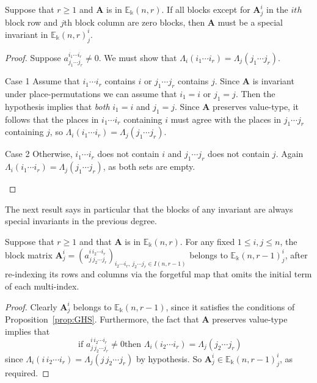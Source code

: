 \documentclass[ALCO,ThmDefs,Unicode,epreuves]{cedram}
\newcommand{\E}{\mathbb{E}}
\newcommand{\bA}{\mathbf{A}}
\begin{document}
\begin{lemm}\label{lem:special-criterion}
 Suppose that $r\ge 1$ and $\bA$ is in $\E_\Bbbk(n,r)$. If all blocks
 except for $\bA^i_j$ in the $ith$ block row and $j$th block column
 are zero blocks, then $\bA$ must be a special invariant in
 $\E_\Bbbk(n,r)^i_j$.
\end{lemm}

\begin{proof}
Suppose $a^{i_1 \cdots i_r}_{j_1\cdots j_r} \ne 0$. We must show
that $\Lambda_i(i_1 \cdots i_r) = \Lambda_j(j_1 \cdots j_r)$.

\begin{enonce*}[remark]{\hypertarget{lemma4.2C1}{Case 1}} Assume that $i_1 \cdots i_r$ contains $i$ or $j_1
\cdots j_r$ contains $j$. Since $\bA$ is invariant under
place-permutations we can assume that $i_1=i$ or $j_1=j$. Then the
hypothesis implies that \emph{both} $i_1=i$ and $j_1=j$. Since $\bA$
preserves value-type, it follows that the places in $i_1 \cdots i_r$
containing $i$ must agree with the places in $j_1 \cdots j_r$
containing $j$, so $\Lambda_i(i_1 \cdots i_r) = \Lambda_j(j_1 \cdots
j_r)$.
\end{enonce*}

\begin{enonce*}[remark]{\hypertarget{lemma4.2C2}{Case 2}} Otherwise, $i_1 \cdots i_r$ does not contain $i$ and
$j_1 \cdots j_r$ does not contain $j$. Again $\Lambda_i(i_1 \cdots
i_r) = \Lambda_j(j_1 \cdots j_r)$, as both sets are empty.\qedhere
\end{enonce*}
\end{proof}


The next result says in particular that the blocks of any invariant
are always special invariants in the previous degree.

\begin{lemm}\label{lem:blocks-are-special}
 Suppose that $r \ge 1$ and that $\bA$ is in $\E_\Bbbk(n,r)$. For any
 fixed $1 \le i,j \le n$, the block matrix $\bA^i_j = (a^{i\, i_2
 \cdots i_r}_{j\,j_2 \cdots j_r})_{i_2 \cdots i_r,\, j_2 \cdots j_r
 \in I(n,r-1)}$ belongs to $\E_\Bbbk(n,r-1)^i_j$, after re-indexing
 its rows and columns via the forgetful map that omits the initial
 term of each multi-index.
\end{lemm}

\begin{proof}
Clearly $\bA^i_j$ belongs to $\E_\Bbbk(n,r-1)$, since it satisfies the
conditions of Proposition~\ref{prop:GHS}. Furthermore, the fact that
$\bA$ preserves value-type implies that
\[
\text{ if } a^{i\, i_2 \cdots i_r}_{j\,j_2 \cdots j_r} \ne 0 \text{
 then } \Lambda_i(i_2 \cdots i_r) = \Lambda_j(j_2 \cdots j_r)
\]
since $\Lambda_i(i\, i_2 \cdots i_r) = \Lambda_j(j\,j_2 \cdots j_r)$
by hypothesis. So $\bA^i_j \in \E_\Bbbk(n,r-1)^i_j$, as
required.
\end{proof}
\end{document}
